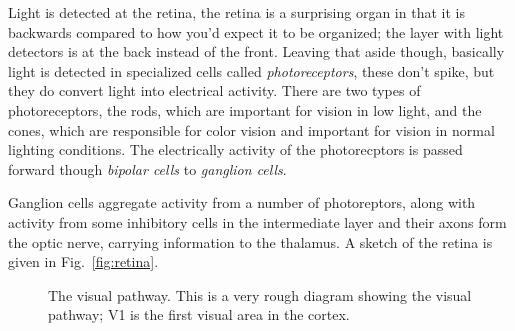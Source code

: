 \documentclass[11pt,a4paper]{scrartcl}
\begin{document}
Light is detected at the retina, the retina is a surprising organ in
that it is backwards compared to how you'd expect it to be organized;
the layer with light detectors is at the back instead of the
front. Leaving that aside though, basically light is detected in
specialized cells called \textsl{photoreceptors}, these don't spike,
but they do convert light into electrical activity. There are two
types of photoreceptors, the rods, which are important for vision in
low light, and the cones, which are responsible for color vision and
important for vision in normal lighting conditions. The electrically
activity of the photorecptors is passed forward though \textsl{bipolar
  cells} to \textsl{ganglion cells}.

Ganglion cells aggregate activity from a number of photoreptors, along
with activity from some inhibitory cells in the intermediate layer and
their axons form the optic nerve, carrying information to the
thalamus. A sketch of the retina is given in Fig.~\ref{fig:retina}.

\begin{figure}
\begin{center}
\end{center}
\caption{The visual pathway. This is a very rough diagram showing the visual pathway; V1 is the first visual area in the cortex.\label{fig:pathway}}
\end{figure}
\end{document}
